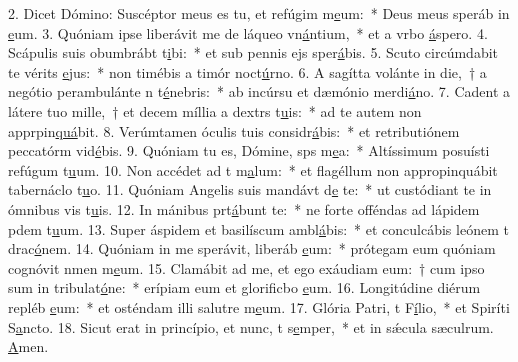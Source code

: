 2. Dicet Dómino: Suscéptor meus es tu, et refúgim m\uline{e}um:~* Deus meus speráb in \uline{e}um.
3. Quóniam ipse liberávit me de láqueo vn\uline{á}ntium,~* et a vrbo \uline{á}spero.
4. Scápulis suis obumbrábt t\uline{i}bi:~* et sub pennis ejs sper\uline{á}bis.
5. Scuto circúmdabit te vérits \uline{e}jus:~* non timébis a timór noct\uline{ú}rno.
6. A sagítta volánte in die,~† a negótio perambulánte n t\uline{é}nebris:~* ab incúrsu et dæmónio merdi\uline{á}no.
7. Cadent a látere tuo mille,~† et decem míllia a dextrs t\uline{u}is:~* ad te autem non apprpin\uline{quá}bit.
8. Verúmtamen óculis tuis considr\uline{á}bis:~* et retributiónem peccatórm vid\uline{é}bis.
9. Quóniam tu es, Dómine, sps m\uline{e}a:~* Altíssimum posuísti refúgum t\uline{u}um.
10. Non accédet ad t m\uline{a}lum:~* et flagéllum non appropinquábit tabernáclo t\uline{u}o.
11. Quóniam Angelis suis mandávt d\uline{e} te:~* ut custódiant te in ómnibus vis t\uline{u}is.
12. In mánibus prt\uline{á}bunt te:~* ne forte offéndas ad lápidem pdem t\uline{u}um.
13. Super áspidem et basilíscum ambl\uline{á}bis:~* et conculcábis leónem t drac\uline{ó}nem.
14. Quóniam in me sperávit, liberáb \uline{e}um:~* prótegam eum quóniam cognóvit nmen m\uline{e}um.
15. Clamábit ad me, et ego exáudiam eum:~† cum ipso sum in tribulat\uline{ó}ne:~* erípiam eum et glorificbo \uline{e}um.
16. Longitúdine diérum repléb \uline{e}um:~* et osténdam illi salutre m\uline{e}um.
17. Glória Patri, t F\uline{í}lio,~* et Spiríti S\uline{a}ncto.
18. Sicut erat in princípio, et nunc, t s\uline{e}mper,~* et in sǽcula sæculrum. \uline{A}men.
